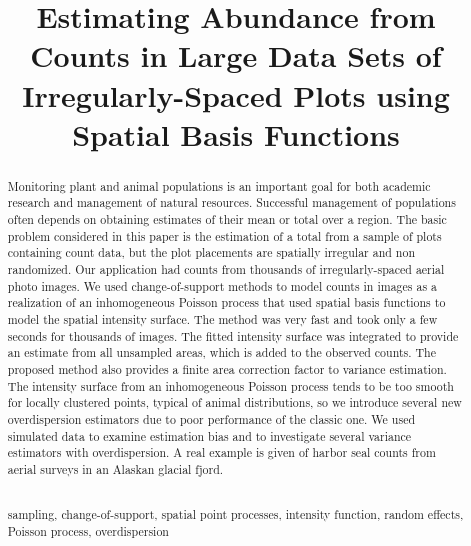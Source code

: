 \documentclass[12pt, titlepage]{article}\usepackage[]{graphicx}\usepackage[]{color}
\begin{document}

\titlepage
\title {Estimating Abundance from Counts in Large Data Sets of Irregularly-Spaced Plots using Spatial Basis Functions}

\maketitle


\begin{abstract}

Monitoring plant and animal populations is an important goal for both academic research and management of natural resources. Successful management of populations often depends on obtaining estimates of their mean or total over a region. The basic problem considered in this paper is the estimation of a total from a sample of plots containing count data, but the plot placements are spatially irregular and non randomized.  Our application had counts from thousands of irregularly-spaced aerial photo images.  We used change-of-support methods to model counts in images as a realization of an inhomogeneous Poisson process that used spatial basis functions to model the spatial intensity surface. The method was very fast and took only a few seconds for thousands of images.  The fitted intensity surface was integrated to provide an estimate from all unsampled areas, which is added to the observed counts. The proposed method also provides a finite area correction factor to variance estimation. The intensity surface from an inhomogeneous Poisson process tends to be too smooth for locally clustered points, typical of animal distributions, so we introduce several new overdispersion estimators due to poor performance of the classic one. We used simulated data to examine estimation bias and to investigate several variance estimators with overdispersion.  A real example is given of harbor seal counts from aerial surveys in an Alaskan glacial fjord. 

\noindent \hrulefill \\
 sampling, change-of-support, spatial point processes, intensity function, random effects, Poisson process, overdispersion

\end{abstract}
\end{document}
